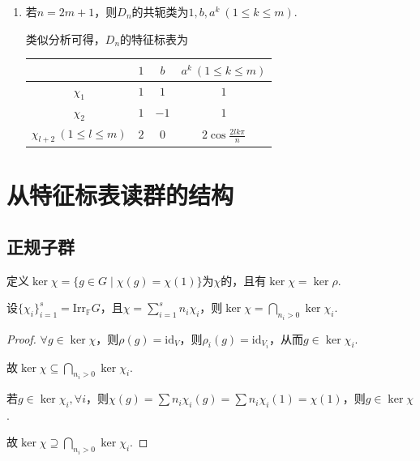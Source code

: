 \begin{instance}
\begin{enumerate}
\begin{center}
\begin{tabular}{c|ccccc}
                $\chi_{l+4}\ (1 \leqslant l \leqslant m-1)$ & $2$ & $2(-1)^l$  & $0$  & $0$  & $2\cos\frac{2lk\pi}{n}$
            \end{tabular}
        \end{center}
        \item[②] 若$n=2m+1$，则$D_n$的共轭类为$1, b, a^k\ (1 \leqslant k \leqslant m)$.\par
        类似分析可得，$D_n$的特征标表为
        \begin{center}
            \begin{tabular}{c|ccc}
                                                     & $1$ & $b$  & $a^k\ (1 \leqslant k \leqslant m)$ \\ \hline
                $\chi_1$                             & $1$ & $1$  & $1$                              \\
                $\chi_2$                             & $1$ & $-1$ & $1$                              \\
                $\chi_{l+2}\ (1 \leqslant l \leqslant m)$ & $2$ & $0$  & $2\cos\frac{2lk\pi}{n}$
            \end{tabular}
        \end{center}
    \end{enumerate}
\end{instance}

\section{从特征标表读群的结构}

\subsection{正规子群}

\begin{definition}[特征标的核]
    定义$\ker \chi = \{g \in G \mid \chi(g) = \chi(1)\}$为$\chi$的，且有$\ker \chi = \ker \rho$.
\end{definition}

\begin{lemma}[]
    设$\{\chi_i\}_{i=1}^s = \mathrm{Irr}_{\mathbb{F}} G$，且$\chi = \sum_{i=1}^s n_i \chi_i$，则$\ker \chi = \bigcap_{n_i>0} \ker \chi_i$.
\end{lemma}

\begin{proof}
    $ \forall g \in \ker \chi $，则$\rho(g) = \mathrm{id}_V$，则$\rho_i(g) = \mathrm{id}_{V_i}$，从而$g \in \ker \chi_i$.\par
    故$\ker \chi \subseteq \bigcap_{n_i>0} \ker \chi_i$.\par
    若$g \in \ker \chi_i, \forall i$，则$\chi(g) = \sum n_i \chi_i(g) = \sum n_i \chi_i(1) = \chi(1)$，则$g \in \ker \chi$.\par
    故$\ker \chi \supseteq \bigcap_{n_i>0} \ker \chi_i$.
\end{proof}

